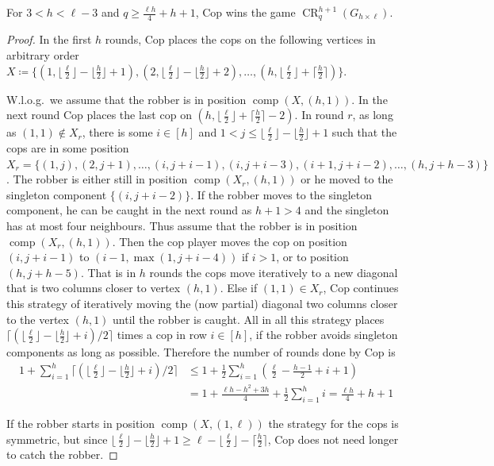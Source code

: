 \documentclass{lmcs}
\theoremstyle{plain}\newtheorem{claim}[thm]{Claim}   %
\DeclareMathOperator{\CR}{CR}
\DeclareMathOperator{\escape}{comp}
\newcommand{\grid}[2]{\ensuremath{G_{#1 \times #2}}}
\begin{document}
\begin{lem}
	\label{lem:upper-bound-rounds}
	For $3<h<\ell-3$ and $q\geq \frac{\ell h}{4} + h +1$,
	Cop wins the game $\CR_q^{h+1}(\grid{h}{\ell})$.
\end{lem}

\begin{proof}
	In the first $h$ rounds, Cop places the cops on the following vertices in arbitrary order $X\coloneqq\{(1,\lfloor\frac{\ell}{2}\rfloor-\lfloor\frac{h}{2}\rfloor+1),(2,\lfloor\frac{\ell}{2}\rfloor-\lfloor\frac{h}{2}\rfloor+2),\ldots,(h,\lfloor\frac{\ell}{2}\rfloor+\lceil\frac{h}{2}\rceil)\}$.
	
	W.l.o.g.\ we assume that the robber is in position $\escape(X,{(h,1)})$.
	In the next round Cop places the last cop on $(h,\lfloor\frac{\ell}{2}\rfloor+\lceil\frac{h}{2}\rceil - 2)$.
	In round $r$, as long as $(1,1)\notin X_r$, there is some $i\in[h]$ and $1<j\leq \lfloor\frac{\ell}{2}\rfloor-\lfloor\frac{h}{2}\rfloor+1$ such that the cops are in some position $X_{r}=\{(1,j), (2,j+1), \ldots, (i,j+i-1), (i,j+i-3), (i+1,j+i-2), \ldots, (h,j+h-3)\}$.
	The robber is either still in position $\escape({X_{r}},{(h,1)})$ or he moved to the singleton component $\{(i,j+i-2)\}$.
	If the robber moves to the singleton component, he can be caught in the next round as $h+1>4$ and the singleton has at most four neighbours.
	Thus assume that the robber is in position $\escape({X_{r}},{(h,1)})$.
	Then the cop player moves the cop on position $(i,j+i-1)$ to $(i-1,\max(1,j+i-4))$ if $i>1$, or to position $(h,j+h-5)$.
	That is in $h$ rounds the cops move iteratively to a new diagonal that is two columns closer to vertex $(h,1)$.
	Else if $(1,1)\in X_r$, Cop continues this strategy of iteratively moving the (now partial) diagonal two columns closer to the vertex $(h,1)$ until the robber is caught.
	All in all this strategy places $\lceil(\lfloor\frac{\ell}{2}\rfloor-\lfloor\frac{h}{2}\rfloor+i)/2\rceil$ times a cop in row $i\in [h]$, if the robber avoids singleton components as long as possible.
	Therefore the number of rounds done by Cop is
	\begin{align*}
		1 + \sum_{i=1}^{h} \lceil(\lfloor\frac{\ell}{2}\rfloor-\lfloor\frac{h}{2}\rfloor+i)/2\rceil &\leq 1 + \frac12 \sum_{i=1}^{h} (\frac{\ell}{2}-\frac{h-1}{2}+i+1)\\
		&= 1 + \frac{\ell h-h^2+3h}{4} +\frac12\sum_{i=1}^{h} i = \frac{\ell h}{4} + h + 1
	\end{align*}
	
	If the robber starts in position $\escape(X,{(1,\ell)})$ the strategy for the cops is symmetric, but since $\lfloor\frac{\ell}{2}\rfloor-\lfloor\frac{h}{2}\rfloor+1\geq \ell - \lfloor\frac{\ell}{2}\rfloor - \lceil\frac{h}{2}\rceil$, Cop does not need longer to catch the robber.
\end{proof}
\end{document}

